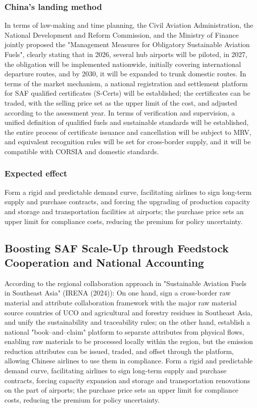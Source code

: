 \documentclass[a4paper,11pt]{article}
\begin{document}
\subsubsection{China's landing method}
In terms of law-making and time planning, the Civil Aviation Administration, the National Development and Reform Commission, and the Ministry of Finance jointly proposed the "Management Measures for Obligatory Sustainable Aviation Fuels", clearly stating that in 2026, several hub airports will be piloted, in 2027, the obligation will be implemented nationwide, initially covering international departure routes, and by 2030, it will be expanded to trunk domestic routes. In terms of the market mechanism, a national registration and settlement platform for SAF qualified certificates (S-Certs) will be established; the certificates can be traded, with the selling price set as the upper limit of the cost, and adjusted according to the assessment year. In terms of verification and supervision, a unified definition of qualified fuels and sustainable standards will be established, the entire process of certificate issuance and cancellation will be subject to MRV, and equivalent recognition rules will be set for cross-border supply, and it will be compatible with CORSIA and domestic standards.

\subsubsection{Expected effect}
Form a rigid and predictable demand curve, facilitating airlines to sign long-term supply and purchase contracts, and forcing the upgrading of production capacity and storage and transportation facilities at airports; the purchase price sets an upper limit for compliance costs, reducing the premium for policy uncertainty.





\subsection{Boosting SAF Scale-Up through Feedstock Cooperation and National Accounting}
According to the regional collaboration approach in "Sustainable Aviation Fuels in Southeast Asia" (IRENA (2024)): On one hand, sign a cross-border raw material and attribute collaboration framework with the major raw material source countries of UCO and agricultural and forestry residues in Southeast Asia, and unify the sustainability and traceability rules; on the other hand, establish a national "book--and--claim" platform to separate attributes from physical flows, enabling raw materials to be processed locally within the region, but the emission reduction attributes can be issued, traded, and offset through the platform, allowing Chinese airlines to use them in compliance. Form a rigid and predictable demand curve, facilitating airlines to sign long-term supply and purchase contracts, forcing capacity expansion and storage and transportation renovations on the part of airports; the purchase price sets an upper limit for compliance costs, reducing the premium for policy uncertainty.
\end{document}
